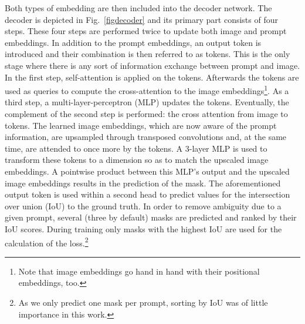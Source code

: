 Both types of embedding are then included into the decoder network. The decoder is depicted in Fig.~\ref{figdecoder} and its primary part consists of four steps. These four steps are performed twice to update both image and prompt embeddings. In addition to the prompt embeddings, an output token is introduced and their combination is then referred to as tokens. This is the only stage where there is any sort of information exchange between prompt and image. In the first step, self-attention is applied on the tokens. Afterwards the tokens are used as queries to compute the cross-attention to the image embeddings\footnote{Note that image embeddings go hand in hand with their positional embeddings, too.}. As a third step, a multi-layer-perceptron (MLP) updates the tokens. Eventually, the complement of the second step is performed: the cross attention from image to tokens. The learned image embeddings, which are now aware of the prompt information, are upsampled through transposed convolutions and, at the same time, are attended to once more by the tokens. A 3-layer MLP is used to transform these tokens to a dimension so as to match the upscaled image embeddings. A pointwise product between this MLP's output and the upscaled image embeddings results in the prediction of the mask. The aforementioned output token is used within a second head to predict values for the intersection over union (IoU) to the ground truth. In order to remove ambiguity due to a given prompt, several (three by default) masks are predicted and ranked by their IoU scores. During training only masks with the highest IoU are used for the calculation of the loss.\footnote{As we only predict one mask per prompt, sorting by IoU was of little importance in this work.} 

